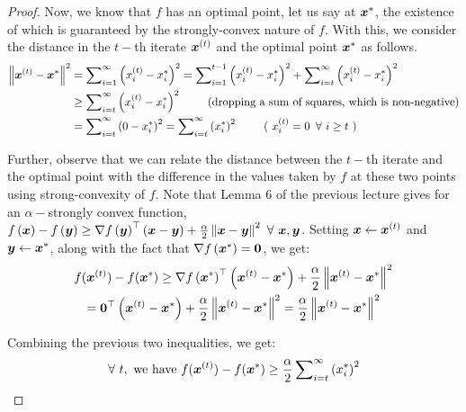 \documentclass{article}
\begin{document}
\begin{proof}
Now, we know that $f$ has an optimal point, let us say at ${\bm{x}}^\ast$, the existence of which is guaranteed by the strongly-convex nature of $f$.
With this, we consider the distance in the $t-$th iterate ${\bm{x}}^{(t)}$ and the optimal point  ${\bm{x}}^{\ast}$ as follows. 
\begin{align}
    \left\Vert
        \vx^{(t)} - \vx^\ast
    \right\rVert^2
	& 
	= 
	\sum\nolimits_{i=1}^{\infty} 
	\left( 
	    \evx^{(t)}_i - \evx^\ast_i
	\right)^2 
	=
	\sum\nolimits_{i=1}^{t - 1} 
	\left( 
	    \evx^{(t)}_i - \evx^\ast_i
	\right)^2 
	+
	\sum\nolimits_{i=t}^{\infty} 
	\left( 
	    \evx^{(t)}_i - \evx^\ast_i
	\right)^2 
	\nonumber\\
	 & 
	 \geq  
	 \sum\nolimits_{i=t}^{\infty} 
	\left( 
	    \evx^{(t)}_i - \evx^\ast_i
	\right)^2\ \tag{dropping a sum of squares, which is non-negative}
	\nonumber\\
	&
	=
	\sum\nolimits_{i=t}^{\infty} 
	\left( 
	    0 - \evx^\ast_i
	\right)^2
	=
	\sum\nolimits_{i=t}^{\infty} 
	\left(\evx^{\ast}_i\right)^2\ \tag{
	    $\evx^{(t)}_i = 0\ \forall\,i\geq t$
	}
\end{align}

Further, observe that we can relate the distance between the $t-$th iterate and the optimal point with the difference in the values taken by $f$ at these two points using strong-convexity of $f$.
Note that Lemma 6 of the previous lecture gives for an $\alpha-$strongly convex function, $f\left(\vx\right) - f\left(\vy\right)\geq \nabla f\left(\vy\right)^\top\left(\vx - \vy\right) + \frac{\alpha}{2}\left\lVert \vx - \vy \right\rVert^2\ \forall\,\vx,\vy$.
Setting ${\bm{x}}\leftarrow{\bm{x}}^{(t)}$ and ${\bm{y}}\leftarrow{\bm{x}}^{\ast}$, along with the fact that $\nabla f\left({\bm{x}}^{\ast}\right) = \mathbf{0}$, we get:
\begin{multline*}
    f({\bm{x}}^{(t)})
    -
    f({\bm{x}}^\ast)
    \geq 
    \nabla f\left({\bm{x}}^{\ast}\right)^\top
    \left({\bm{x}}^{(t)} - {\bm{x}}^\ast\right)
    + 
    \frac{\alpha}{2}
    \left\lVert 
        {\bm{x}}^{(t)} - {\bm{x}}^{\ast}
    \right\rVert^2
    \\
    =
    \mathbf{0}^\top
    \left({\bm{x}}^{(t)} - {\bm{x}}^\ast\right)
    + 
    \frac{\alpha}{2}
    \left\lVert 
        {\bm{x}}^{(t)} - {\bm{x}}^{\ast}
    \right\rVert^2
    =
    \frac{\alpha}{2}
    \left\lVert 
        {\bm{x}}^{(t)} - {\bm{x}}^{\ast}
    \right\rVert^2
\end{multline*}

Combining the previous two inequalities, we get:
$$
    \forall\,t,\ \text{we have}\ 
    f(\vx^{(t)})
    -
    f(\vx^\ast)
    \geq 
    \frac{\alpha}{2}
    \sum\nolimits_{i = t}^\infty
    \left(x^\ast_i\right)^2
$$


\end{proof}
\end{document}
